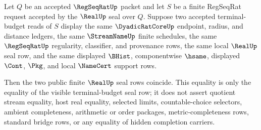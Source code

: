 \begin{theorem}
\label{thm:real-regseqrat-terminal-budget-seal-uniqueness}
Let $Q$ be an accepted $\RegSeqRatUp$ packet and let $S$ be a finite RegSeqRat request accepted by the $\RealUp$ seal over $Q$. Suppose two accepted terminal-budget reads of $S$ display the same $\DyadicRatCoreUp$ endpoint, radius, and distance ledgers, the same $\StreamNameUp$ finite schedules, the same $\RegSeqRatUp$ regularity, classifier, and provenance rows, the same local $\RealUp$ seal row, and the same displayed $\BHist$, componentwise $\hsame$, displayed $\Cont$, $\Pkg$, and local $\NameCert$ support rows.

Then the two public finite $\RealUp$ seal rows coincide. This equality is only the equality of the visible terminal-budget seal row; it does not assert quotient stream equality, host real equality, selected limits, countable-choice selectors, ambient completeness, arithmetic or order packages, metric-completeness rows, standard bridge rows, or any equality of hidden completion carriers.
\end{theorem}
